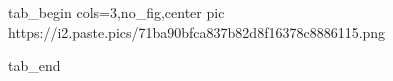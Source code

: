  
 
 
 
 
\qqSecCmtScr

\ifcmt
  tab_begin cols=3,no_fig,center
     pic https://i2.paste.pics/71ba90bfca837b82d8f16378c8886115.png

  tab_end
\fi
